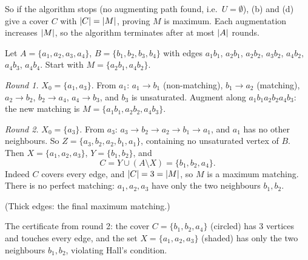 So if the algorithm stops (no augmenting path found, i.e.\ $U = \emptyset$), (b) and (d) give a
cover $C$ with $\left\lvert C \right\rvert = \left\lvert M \right\rvert$, proving $M$ is maximum. Each augmentation increases $\left\lvert M \right\rvert$,
so the algorithm terminates after at most $\left\lvert A \right\rvert$ rounds.

\begin{example}
Let $A = \{a_1,a_2,a_3,a_4\}$, $B=\{b_1,b_2,b_3,b_4\}$ with edges
$a_1b_1$, $a_2b_1$, $a_2b_2$, $a_3b_2$, $a_4b_2$, $a_4b_3$, $a_4b_4$. Start with $M = \{a_2b_1, a_4b_2\}$.

\emph{Round 1.} $X_0 = \{a_1, a_3\}$. From $a_1$: $a_1 \to b_1$ (non-matching), $b_1 \to a_2$
(matching), $a_2 \to b_2$, $b_2 \to a_4$, $a_4 \to b_3$, and $b_3$ is unsaturated. Augment along
$a_1b_1a_2b_2a_4b_3$: the new matching is $M = \{a_1b_1, a_2b_2, a_4b_3\}$.

\emph{Round 2.} $X_0 = \{a_3\}$. From $a_3$: $a_3 \to b_2 \to a_2 \to b_1 \to a_1$, and $a_1$ has
no other neighbours. So $Z = \{a_3, b_2, a_2, b_1, a_1\}$, containing no unsaturated vertex of $B$.
Then $X = \{a_1,a_2,a_3\}$, $Y = \{b_1,b_2\}$, and
\[
C = Y \cup (A\setminus X) = \{b_1, b_2, a_4\}.
\]
Indeed $C$ covers every edge, and $\left\lvert C \right\rvert = 3 = \left\lvert M \right\rvert$, so $M$ is a maximum matching. There is
no perfect matching: $a_1, a_2, a_3$ have only the two neighbours $b_1, b_2$.
\begin{center}
\end{center}
(Thick edges: the final maximum matching.)

The certificate from round 2: the cover $C = \{b_1, b_2, a_4\}$ (circled) has $3$ vertices and
touches every edge, and the set $X = \{a_1, a_2, a_3\}$ (shaded) has only the two neighbours
$b_1, b_2$, violating Hall's condition.
\begin{center}
\end{center}
\end{example}

